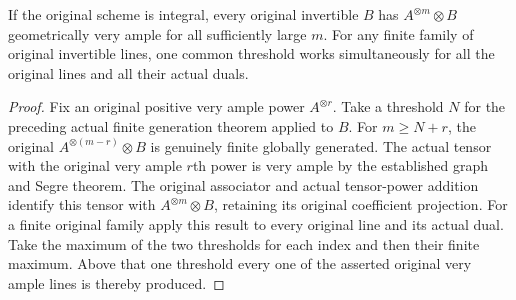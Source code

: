 \begin{theorem}
\label{thm:fc-original-ample-line-twist-very-ample}
\leanok
{}
If the original scheme is integral, every original invertible $B$ has
$A^{\otimes m}\otimes B$ geometrically very ample for all sufficiently
large $m$. For any finite family of original invertible lines, one
common threshold works simultaneously for all the original lines and
all their actual duals.
\end{theorem}
\begin{proof}
Fix an original positive very ample power $A^{\otimes r}$. Take a
threshold $N$ for the preceding actual finite generation theorem applied
to $B$. For $m\geq N+r$, the original
$A^{\otimes(m-r)}\otimes B$ is genuinely finite globally generated.
The actual tensor with the original very ample $r$th power is very
ample by the established graph and Segre theorem. The original
associator and actual tensor-power addition identify this tensor with
$A^{\otimes m}\otimes B$, retaining its original coefficient projection.
For a finite original family apply this result to every original line
and its actual dual. Take the maximum of the two thresholds for each
index and then their finite maximum. Above that one threshold every
one of the asserted original very ample lines is thereby produced.
\end{proof}
